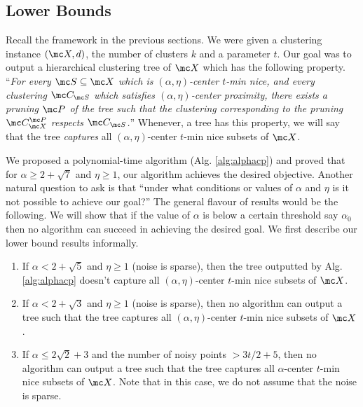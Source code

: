 \documentclass[11pt]{article}
\begin{document}
\subsection{Lower Bounds}
\label{sec:alphaLBd}
Recall the framework in the previous sections. We were given a clustering instance $(\mc X, d)$, the number of clusters $k$ and a parameter $t$. Our goal was to output a hierarchical clustering tree of $\mc X$ which has the following property. ``{\it For every $\mc S \subseteq \mc X$ which is $(\alpha, \eta)$-center $t$-min nice, and every clustering $\mc C_{\mc S}$ which satisfies $(\alpha, \eta)$-center proximity, there exists a pruning $\mc P$ of the tree such that the clustering corresponding to the pruning $\mc C_{\mc X}^{\mc P}$ respects $\mc C_{\mc S}$.}'' Whenever, a tree has this property, we will say that the tree {\it captures} all $(\alpha, \eta)$-center $t$-min nice subsets of $\mc X$.

We proposed a polynomial-time algorithm (Alg. \ref{alg:alphacp}) and proved that for $\alpha \ge 2+\sqrt 7$ and $\eta \ge 1$, our algorithm achieves the desired objective. Another natural question to ask is that ``under what conditions or values of $\alpha$ and $\eta$ is it not possible to achieve our goal?'' The general flavour of results would be the following. We will show that if the value of $\alpha$ is below a certain threshold say $\alpha_0$ then no algorithm can succeed in achieving the desired goal. We first describe our lower bound results informally.

\begin{enumerate}[nolistsep, noitemsep, label=\textbf{L.\arabic*}]
\renewcommand\labelitemi{$\diamond$}
\item \label{lowerBd:alphacp1} If $\alpha < 2 + \sqrt{5}$ and $\eta \ge 1$ (noise is sparse), then the tree outputted by Alg. \ref{alg:alphacp} doesn't capture all $(\alpha, \eta)$-center $t$-min nice subsets of $\mc X$. 
\item \label{lowerBd:alphacp2} If $\alpha < 2 + \sqrt{3}$ and $\eta \ge 1$ (noise is sparse), then no algorithm can output a tree such that the tree captures all $(\alpha, \eta)$-center $t$-min nice subsets of $\mc X$.
\item \label{lowerBd:alphacp3} If $\alpha \le 2\sqrt{2}+3$ and the number of noisy points $ > 3t/2+5$, then no algorithm can output a tree such that the tree captures all $\alpha$-center $t$-min nice subsets of $\mc X$. Note that in this case, we do not assume that the noise is sparse.
\end{enumerate}
\end{document}
